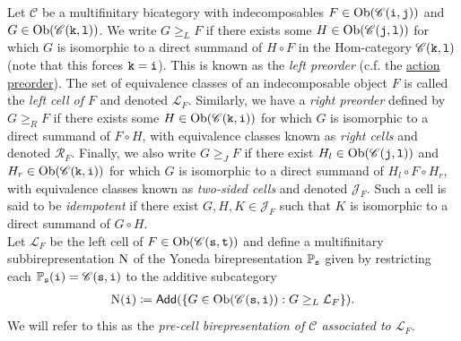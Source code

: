 \noindent Let $\mathscr{C}$ be a multifinitary bicategory with indecomposables $F \in \textnormal{Ob}(\mathscr{C}(\textnormal{\texttt{i}}, \textnormal{\texttt{j}}))$ and $G \in \textnormal{Ob}(\mathscr{C}(\textnormal{\texttt{k}}, \textnormal{\texttt{l}}))$. We write $G \geq_L F$ if there exists some $H \in \textnormal{Ob}(\mathscr{C}(\textnormal{\texttt{j}}, \textnormal{\texttt{l}}))$ for which $G$ is isomorphic to a direct summand of $H \circ F$ in the Hom-category $\mathscr{C}(\textnormal{\texttt{k}}, \textnormal{\texttt{l}})$ (note that this forces $\textnormal{\texttt{k}} = \textnormal{\texttt{i}}$). This is known as the {\em left preorder} (c.f. the \hyperref[ActionPreorder]{action preorder}). The set of equivalence classes of an indecomposable object $F$ is called the {\em left cell of $F$} and denoted $\mathcal{L}_F$. Similarly, we have a {\em right preorder} defined by $G \geq_R F$ if there exists some $H \in \textnormal{Ob}(\mathscr{C}(\textnormal{\texttt{k}}, \textnormal{\texttt{i}}))$ for which $G$ is isomorphic to a direct summand of $F \circ H$, with equivalence classes known as {\em right cells} and denoted $\mathcal{R}_F$. Finally, we also write $G \geq_{J} F$ if there exist $H_l \in \textnormal{Ob}(\mathscr{C}(\textnormal{\texttt{j}}, \textnormal{\texttt{l}}))$ and $H_r \in \textnormal{Ob}(\mathscr{C}(\textnormal{\texttt{k}}, \textnormal{\texttt{i}}))$ for which $G$ is isomorphic to a direct summand of $H_l \circ F \circ H_r$, with equivalence classes known as {\em two-sided cells} and denoted $\mathcal{J}_F$. Such a cell is said to be {\em idempotent} if there exist $G, H, K \in \mathcal{J}_F$ such that $K$ is isomorphic to a direct summand of $G \circ H$.\\


\noindent Let $\mathcal{L}_F$ be the left cell of $F \in \textnormal{Ob}(\mathscr{C}(\textnormal{\texttt{s}}, \textnormal{\texttt{t}}))$ and define a multifinitary subbirepresentation $\textup{N}$ of the Yoneda birepresentation $\mathbb{P}_{\textnormal{\texttt{s}}}$ given by restricting each $\mathbb{P}_{\textnormal{\texttt{s}}}(\textnormal{\texttt{i}}) = \mathscr{C}(\textnormal{\texttt{s}}, \textnormal{\texttt{i}})$ to the additive subcategory
\begin{align*}
\begin{split}
\textup{N}(\textnormal{\texttt{i}}) \coloneqq \textnormal{\textsf{Add}}(\{G \in \textnormal{Ob}(\mathscr{C}(\textnormal{\texttt{s}}, \textnormal{\texttt{i}})) : G \geq_L \mathcal{L}_F\}).
\end{split}
\end{align*}
\noindent We will refer to this as the \textit{pre-cell birepresentation of $\mathscr{C}$ associated to $\mathcal{L}_F$}.\\

